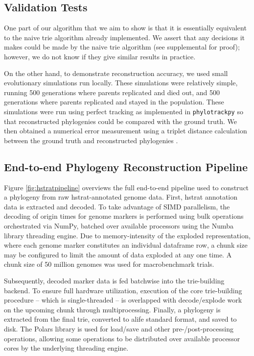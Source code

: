\subsection{Validation Tests}

One part of our algorithm that we aim to show is that it is essentially equivalent to the naive trie algorithm already implemented.
We assert that any decisions it makes could be made by the naive trie algorithm (see supplemental \citep{supplemental} for proof); however, we do not know if they give similar results in practice.

On the other hand, to demonstrate reconstruction accuracy, we used small evolutionary simulations run locally. 
These simulations were relatively simple, running 500 generations where parents replicated and died out, and 500 generations where parents replicated and stayed in the population. These simulations were run using perfect tracking as implemented in \texttt{phylotrackpy} \citep{dolson2024phylotrack} so that reconstructed phylogenies could be compared with the ground truth.
We then obtained a numerical error measurement using a triplet distance calculation between the ground truth and reconstructed phylogenies \citep{critchlow1996triples}.

\subsection{End-to-end Phylogeny Reconstruction Pipeline}
\label{sec:pipeline}



Figure \ref{fig:hstratpipeline} overviews the full end-to-end pipeline used to construct a phylogeny from raw hstrat-annotated genome data.
First, hstrat annotation data is extracted and decoded.
To take advantage of SIMD parallelism, the decoding of origin times for genome markers is performed using bulk operations orchestrated via NumPy, batched over available processors using the Numba library threading engine.
Due to memory-intensity of the exploded representation, where each genome marker constitutes an individual dataframe row, a chunk size may be configured to limit the amount of data exploded at any one time.
A chunk size of 50 million genomes was used for macrobenchmark trials.

Subsequently, decoded marker data is fed batchwise into the trie-building backend.
To ensure full hardware utilization, execution of the core trie-building procedure -- which is single-threaded -- is overlapped with decode/explode work on the upcoming chunk through multiprocessing.
Finally, a phylogeny is extracted from the final trie, converted to alife standard format, and saved to disk.
The Polars library is used for load/save and other pre-/post-processing operations, allowing some operations to be distributed over available processor cores by the underlying threading engine.

